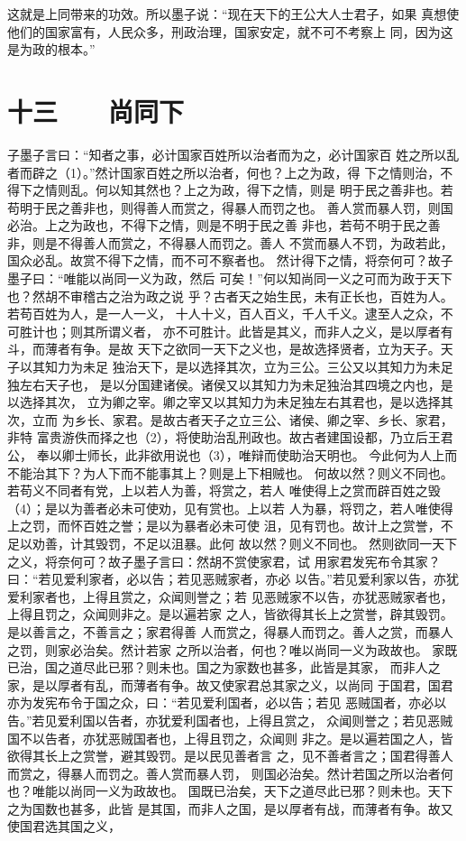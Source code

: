 \documentclass[12pt,UTF8]{ctexbook}
\begin{document}
这就是上同带来的功效。所以墨子说：“现在天下的王公大人士君子，如果 
真想使他们的国家富有，人民众多，刑政治理，国家安定，就不可不考察上 
同，因为这是为政的根本。” 


\chapter{十三　　尚同下}

子墨子言曰：“知者之事，必计国家百姓所以治者而为之，必计国家百 
姓之所以乱者而辟之（1）。”然计国家百姓之所以治者，何也？上之为政，得 
下之情则治，不得下之情则乱。何以知其然也？上之为政，得下之情，则是 
明于民之善非也。若苟明于民之善非也，则得善人而赏之，得暴人而罚之也。 
善人赏而暴人罚，则国必治。上之为政也，不得下之情，则是不明于民之善 
非也，若苟不明于民之善非，则是不得善人而赏之，不得暴人而罚之。善人 
不赏而暴人不罚，为政若此，国众必乱。故赏不得下之情，而不可不察者也。 
然计得下之情，将奈何可？故子墨子曰：“唯能以尚同一义为政，然后 
可矣！”何以知尚同一义之可而为政于天下也？然胡不审稽古之治为政之说 
乎？古者天之始生民，未有正长也，百姓为人。若苟百姓为人，是一人一义， 
十人十义，百人百义，千人千义。逮至人之众，不可胜计也；则其所谓义者， 
亦不可胜计。此皆是其义，而非人之义，是以厚者有斗，而薄者有争。是故 
天下之欲同一天下之义也，是故选择贤者，立为天子。天子以其知力为未足 
独治天下，是以选择其次，立为三公。三公又以其知力为未足独左右天子也， 
是以分国建诸侯。诸侯又以其知力为未足独治其四境之内也，是以选择其次， 
立为卿之宰。卿之宰又以其知力为未足独左右其君也，是以选择其次，立而 
为乡长、家君。是故古者天子之立三公、诸侯、卿之宰、乡长、家君，非特 
富贵游佚而择之也（2），将使助治乱刑政也。故古者建国设都，乃立后王君公， 
奉以卿士师长，此非欲用说也（3），唯辩而使助治天明也。 
今此何为人上而不能治其下？为人下而不能事其上？则是上下相贼也。 
何故以然？则义不同也。若苟义不同者有党，上以若人为善，将赏之，若人 
唯使得上之赏而辟百姓之毁（4）；是以为善者必未可使劝，见有赏也。上以若 
人为暴，将罚之，若人唯使得上之罚，而怀百姓之誉；是以为暴者必未可使 
沮，见有罚也。故计上之赏誉，不足以劝善，计其毁罚，不足以沮暴。此何 
故以然？则义不同也。 
然则欲同一天下之义，将奈何可？故子墨子言曰：然胡不赏使家君，试 
用家君发宪布令其家？曰：“若见爱利家者，必以告；若见恶贼家者，亦必 
以告。”若见爱利家以告，亦犹爱利家者也，上得且赏之，众闻则誉之；若 
见恶贼家不以告，亦犹恶贼家者也，上得且罚之，众闻则非之。是以遍若家 
之人，皆欲得其长上之赏誉，辟其毁罚。是以善言之，不善言之；家君得善 
人而赏之，得暴人而罚之。善人之赏，而暴人之罚，则家必治矣。然计若家 
之所以治者，何也？唯以尚同一义为政故也。 
家既已治，国之道尽此已邪？则未也。国之为家数也甚多，此皆是其家， 
而非人之家，是以厚者有乱，而薄者有争。故又使家君总其家之义，以尚同 
于国君，国君亦为发宪布令于国之众，曰：“若见爱利国者，必以告；若见 
恶贼国者，亦必以告。”若见爱利国以告者，亦犹爱利国者也，上得且赏之， 
众闻则誉之；若见恶贼国不以告者，亦犹恶贼国者也，上得且罚之，众闻则 
非之。是以遍若国之人，皆欲得其长上之赏誉，避其毁罚。是以民见善者言 
之，见不善者言之；国君得善人而赏之，得暴人而罚之。善人赏而暴人罚， 
则国必治矣。然计若国之所以治者何也？唯能以尚同一义为政故也。 
国既已治矣，天下之道尽此已邪？则未也。天下之为国数也甚多，此皆 
是其国，而非人之国，是以厚者有战，而薄者有争。故又使国君选其国之义， 
\end{document}
